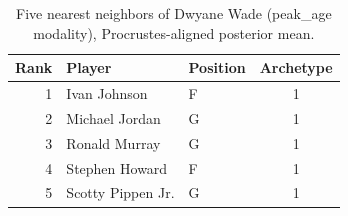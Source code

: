 \begin{table}[htbp]
  \centering\small
  \begin{tabular}{rllc}
    \toprule
    Rank & Player & Position & Archetype \\
    \midrule
    1 & Ivan Johnson & F & 1 \\
    2 & Michael Jordan & G & 1 \\
    3 & Ronald Murray & G & 1 \\
    4 & Stephen Howard & F & 1 \\
    5 & Scotty Pippen Jr. & G & 1 \\
    \bottomrule
  \end{tabular}
  \caption{Five nearest neighbors of Dwyane Wade (peak_age modality), Procrustes-aligned posterior mean.}
  \label{tab:Dwyane_Wade_neighbors_peak_age}
\end{table}

